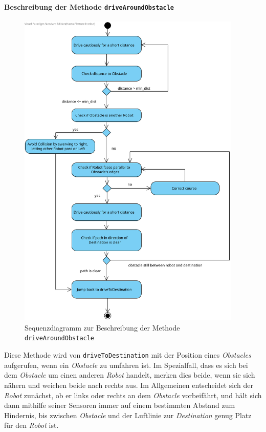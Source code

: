 			\paragraph{Beschreibung der Methode \texttt{driveAroundObstacle}}
			\begin{figure}[H]
			\centering
			\includegraphics[width=0.95\textwidth]{img/1-Entwurf-7-driveAroundObstacle}
			\caption{Sequenzdiagramm zur Beschreibung der Methode \texttt{driveAroundObstacle}}
			\label{SequenzDriveAroundObstacle}
			\end{figure}

			Diese Methode wird von \texttt{driveToDestination} mit der Position eines \textit{Obstacles} aufgerufen, 
			wenn ein \textit{Obstacle} zu umfahren ist. 
			Im Spezialfall, dass es sich bei dem \textit{Obstacle} um einen anderen \textit{Robot} handelt, merken dies beide, wenn sie sich nähern und weichen beide nach rechts aus. 
			Im Allgemeinen entscheidet sich der \emph{Robot} zunächst, ob er links oder rechts an dem \textit{Obstacle} vorbeifährt, 
			und hält sich dann mithilfe seiner Sensoren immer auf einem bestimmten Abstand zum Hindernis, bis zwischen 
			\textit{Obstacle} und der Luftlinie zur \textit{Destination} genug Platz für den \textit{Robot} ist.
			
